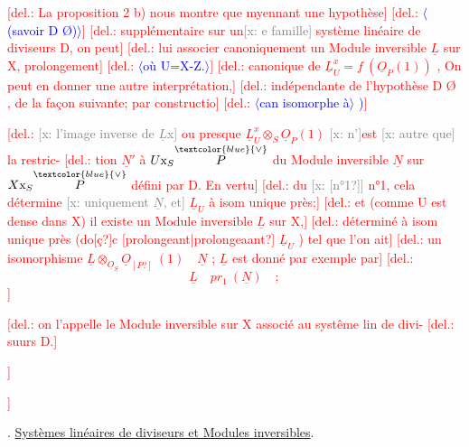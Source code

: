 \documentclass[11pt]{article}
\newcommand{\scanpage}[1]{\par\bigskip\noindent{\small\sffamily[scan #1]}\par}
\newcommand{\mspage}[1]{{\small\sffamily[p.\,#1]}}
\newcommand{\hand}[1]{\textcolor{blue}{#1}}
\let\over\relax
\newcommand{\over}[2]{\textcolor{gray}{#1}\textcolor{blue}{\ensuremath{^{\!\nearrow}}#2}}
\newcommand{\inserted}[2][]{\textcolor{blue}{$\langle$#2$\rangle$}}
\newcommand{\deleted}[1]{\textcolor{red}{[\textsf{del.:} #1]}}
\newcommand{\xout}[1]{\textcolor{gray}{[\textsf{x:} #1]}}
\newcommand{\uline}[1]{\underline{#1}}
\newcommand{\unsure}[1]{[#1?]}
\begin{document}
\deleted{La proposition 2  b)  nous montre que myennant une hypothèse}
\deleted{\inserted[typed]{(savoir D \quad Ø)}}
\deleted{supplémentaire sur un\xout{e famille} système linéaire de diviseurs D, on peut}
\deleted{lui associer canoniquement un Module inversible $\underline{L}$ sur X, prolongement}
\deleted{\inserted[typed]{où U=X-Z.}}
\deleted{canonique de $\underline{L}^{x}_{U} = f\ (\underline{O}_P(1))$ ,  On peut en donner une autre interprétation,}
\deleted{indépendante de l'hypothèse  D \quad Ø , de la façon suivante; par constructio}
\deleted{\inserted[typed]{can isomorphe à} \hand{)}}
\deleted{\xout{l'image inverse de $\underline{L}$x} ou presque $\underline{L}^{x}_{U}\otimes_S\underline{O}_P(1)$ \xout{n'}est \xout{autre que} la restric-%
\deleted{tion $\underline{N}'$ à $U\mathrm{x}_S\overset{\hand{\vee}}{P}$  du  Module inversible $\underline{N}$  sur $X\mathrm{x}_S\overset{\hand{\vee}}{P}$  défini par D. En vertu}
\deleted{du \xout{\unsure{n°1}} n°1, cela détermine \xout{uniquement $\underline{N}$, et} $\underline{L}_U$  à isom unique près;}
\deleted{et  (comme U est dense dans X)  il existe  un Module inversible $\underline{L}$ sur X,}
\deleted{déterminé à isom unique près (do\unsure{ç}c \unsure{prolongeant|prolongeaant} $\underline{L}_U$ ) tel que  l'on ait}
\deleted{un isomorphisme  $\underline{L}\otimes_{\underline{O}_S}\underline{O}_{\unsure{P}}\ (1) \quad \underline{N}$ ;  $\underline{L}$  est donné par exemple par}
\deleted{\[ \underline{L} \quad pr_1\ (\underline{N}) \quad ; \]}
\deleted{on l'appelle  le Module inversible sur X associé au systême lin de divi-%
\deleted{suurs D.}

\mspage{122}

}}

\clearpage
\scanpage{25/123}
\mspage{26}

\over{7}{4}. \uline{Systèmes linéaires de diviseurs et Modules inversibles}.
\end{document}

